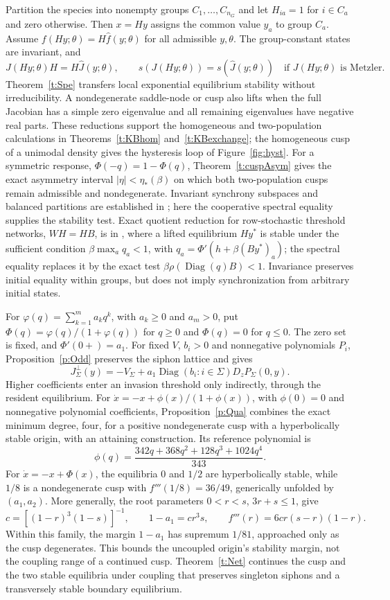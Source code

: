 \begin{enumerate}
Partition the species into nonempty groups $C_1,\ldots,C_{n_G}$ and
let $H_{ia}=1$ for $i\in C_a$ and zero otherwise. Then $x=Hy$
assigns the common value $y_a$ to group $C_a$.
Assume $f(Hy;\theta)=H\widehat f(y;\theta)$ for all admissible
$y,\theta$. The group-constant states are invariant, and
\[
 J(Hy;\theta)H=H\widehat J(y;\theta),\qquad
 s(J(Hy;\theta))=s(\widehat J(y;\theta))
 \quad\text{if }J(Hy;\theta)\text{ is Metzler}.
\]
Theorem~\ref{t:Spe} transfers local exponential equilibrium stability
without irreducibility. A nondegenerate saddle-node or cusp also lifts
when the full Jacobian has a simple zero eigenvalue and all remaining
eigenvalues have negative real parts. These reductions support the
homogeneous and two-population calculations in
Theorems~\ref{t:KBhom} and~\ref{t:KBexchange}; the homogeneous cusp of a unimodal density
gives the hysteresis loop of Figure~\ref{fig:hyst}. For a symmetric response,
$\Phi(-q)=1-\Phi(q)$, Theorem~\ref{t:cuspAsym} gives the exact
asymmetry interval $|\eta|<\eta_*(\beta)$ on which both two-population cusps remain
admissible and nondegenerate.
Invariant synchrony subspaces and balanced partitions are established
in \cite{SGP03,golubitsky2005patterns}; here the cooperative spectral
equality supplies the stability test. Exact quotient reduction for row-stochastic
threshold networks, $WH=HB$, is in \cite{Boud26}, where a lifted equilibrium $Hy^*$ is
stable under the sufficient condition $\beta\max_aq_a<1$, with
$q_a=\Phi'(h+\beta(By^*)_a)$; the spectral equality replaces it by the exact test
$\beta\rho(\operatorname{Diag}(q)B)<1$. Invariance preserves initial
equality within groups, but does not imply synchronization from
arbitrary initial states.

For $\varphi(q)=\sum_{k=1}^m a_kq^k$, with $a_k\ge0$ and $a_m>0$,
put $\Phi(q)=\varphi(q)/(1+\varphi(q))$ for $q\ge0$ and $\Phi(q)=0$ for $q\le0$.
The zero set is fixed, and $\Phi'(0+)=a_1$.
For fixed $V$, $b_i>0$ and nonnegative polynomials $P_i$,
Proposition~\ref{p:Odd} preserves the siphon lattice and gives
\[
 J_\Sigma^\perp(y)=-V_\Sigma
 +a_1\operatorname{Diag}(b_i:i\in\Sigma)D_zP_\Sigma(0,y).
\]
Higher coefficients enter an invasion threshold only indirectly,
through the resident equilibrium. For $\dot x=-x+\phi(x)/(1+\phi(x))$,
with $\phi(0)=0$ and nonnegative polynomial coefficients, Proposition~\ref{p:Qua} combines
the exact minimum degree, four, for a positive nondegenerate cusp with a hyperbolically
stable origin, with an attaining construction.
Its reference polynomial is
\[
 \phi(q)=\frac{342q+368q^2+128q^3+1024q^4}{343}.
\]
For $\dot x=-x+\Phi(x)$, the equilibria $0$ and $1/2$ are hyperbolically
stable, while $1/8$ is a nondegenerate cusp with $f'''(1/8)=36/49$,
generically unfolded by $(a_1,a_2)$. More generally, the root parameters
$0<r<s$, $3r+s\le1$, give
\[
 c=[(1-r)^3(1-s)]^{-1},\qquad
 1-a_1=cr^3s,\qquad f'''(r)=6cr(s-r)(1-r).
\]
Within this family, the margin $1-a_1$ has supremum $1/81$, approached only as the cusp
degenerates. This bounds the uncoupled origin's stability margin,
not the coupling range of a continued cusp.
Theorem~\ref{t:Net} continues the cusp and the two stable equilibria
under coupling that preserves singleton siphons and a transversely
stable boundary equilibrium.


\end{enumerate}
